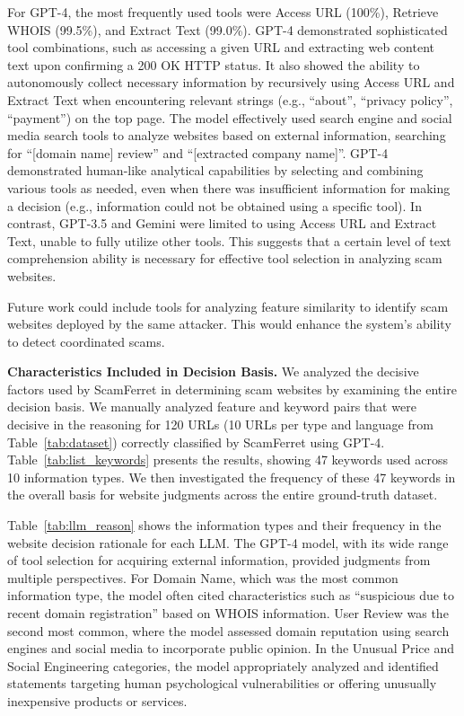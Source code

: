\documentclass[runningheads]{llncs}
\begin{document}
For GPT-4, the most frequently used tools were Access URL (100\%), Retrieve WHOIS (99.5\%), and Extract Text (99.0\%).
GPT-4 demonstrated sophisticated tool combinations, such as accessing a given URL and extracting web content text upon confirming a 200 OK HTTP status.
It also showed the ability to autonomously collect necessary information by recursively using Access URL and Extract Text when encountering relevant strings (e.g., ``about'', ``privacy policy'', ``payment'') on the top page.
The model effectively used search engine and social media search tools to analyze websites based on external information, searching for ``[domain name] review'' and ``[extracted company name]''.
GPT-4 demonstrated human-like analytical capabilities by selecting and combining various tools as needed, even when there was insufficient information for making a decision (e.g., information could not be obtained using a specific tool).
In contrast, GPT-3.5 and Gemini were limited to using Access URL and Extract Text, unable to fully utilize other tools.
This suggests that a certain level of text comprehension ability is necessary for effective tool selection in analyzing scam websites.

Future work could include tools for analyzing feature similarity to identify scam websites deployed by the same attacker.
This would enhance the system's ability to detect coordinated scams.

\noindent\textbf{Characteristics Included in Decision Basis.}
We analyzed the decisive factors used by ScamFerret in determining scam websites by examining the entire decision basis.
We manually analyzed feature and keyword pairs that were decisive in the reasoning for 120 URLs (10 URLs per type and language from Table~\ref{tab:dataset}) correctly classified by ScamFerret using GPT-4.
Table~\ref{tab:list_keywords} presents the results, showing 47 keywords used across 10 information types.
We then investigated the frequency of these 47 keywords in the overall basis for website judgments across the entire ground-truth dataset.

Table~\ref{tab:llm_reason} shows the information types and their frequency in the website decision rationale for each LLM.
The GPT-4 model, with its wide range of tool selection for acquiring external information, provided judgments from multiple perspectives.
For Domain Name, which was the most common information type, the model often cited characteristics such as ``suspicious due to recent domain registration'' based on WHOIS information.
User Review was the second most common, where the model assessed domain reputation using search engines and social media to incorporate public opinion.
In the Unusual Price and Social Engineering categories, the model appropriately analyzed and identified statements targeting human psychological vulnerabilities or offering unusually inexpensive products or services.
\end{document}
